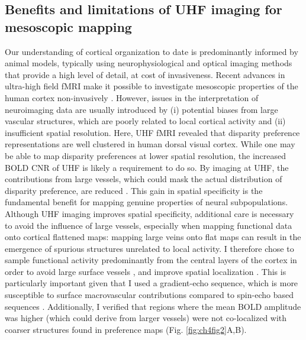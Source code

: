 \subsection{Benefits and limitations of UHF imaging for mesoscopic mapping}
Our understanding of cortical organization to date is predominantly informed by animal models, typically using neurophysiological and optical imaging methods that provide a high level of detail, at cost of invasiveness. Recent advances in ultra-high field fMRI make it possible to investigate mesoscopic properties of the human cortex non-invasively \cite{Cheng:2001fk,Yacoub:2008hr,Zimmermann:2011kl}. However, issues in the interpretation of neuroimaging data are usually introduced by (i) potential biases from large vascular structures, which are poorly related to local cortical activity and (ii) insufficient spatial resolution. Here, UHF fMRI revealed that disparity preference representations are well clustered in human dorsal visual cortex. While one may be able to map disparity preferences at lower spatial resolution, the increased BOLD CNR of UHF is likely a requirement to do so. By imaging at UHF, the contributions from large vessels, which could mask the actual distribution of disparity preference, are reduced \cite{Gati:1997uq,Ogawa:1998fk,Ugurbil:2003uq}. This gain in spatial specificity is the fundamental benefit for mapping genuine properties of neural subpopulations.
Although UHF imaging improves spatial specificity, additional care is necessary to avoid the influence of large vessels, especially when mapping functional data onto cortical flattened maps: mapping large veins onto flat maps can result in the emergence of spurious structures unrelated to local activity. I therefore chose to sample functional activity predominantly from the central layers of the cortex in order to avoid large surface vessels \cite{Zimmermann:2011kl,SanchezPanchuelo:2012jq}, and improve spatial localization \cite{Polimeni:2010fl}. This is particularly important given that I used a gradient-echo sequence, which is more susceptible to surface macrovascular contributions compared to spin-echo based sequences \cite{De-Martino:2013wl}. Additionally, I verified that regions where the mean BOLD amplitude was higher (which could derive from larger vessels) were not co-localized with coarser structures found in preference maps (Fig. \ref{fig:ch4fig2}A,B).
